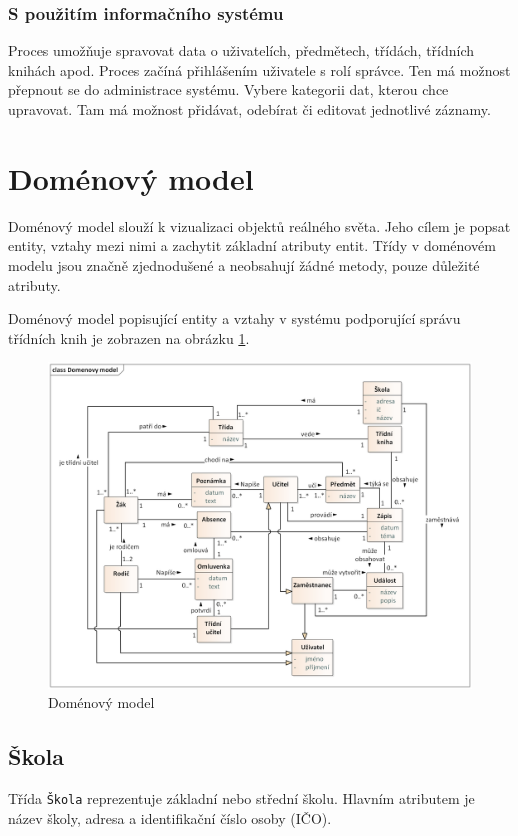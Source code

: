 \subsubsection*{S použitím informačního systému}
Proces umožňuje spravovat data o uživatelích, předmětech, třídách, třídních knihách apod. Proces začíná přihlášením uživatele s rolí správce. Ten má možnost přepnout se do administrace systému. Vybere kategorii dat, kterou chce upravovat. Tam má možnost přidávat, odebírat či editovat jednotlivé záznamy.


\section{Doménový model}
Doménový model slouží k vizualizaci objektů reálného světa. Jeho cílem je popsat entity, vztahy mezi nimi a zachytit základní atributy entit. Třídy v doménovém modelu jsou značně zjednodušené a neobsahují žádné metody, pouze důležité atributy.

Doménový model popisující entity a vztahy v systému podporující správu třídních knih je zobrazen na obrázku \ref{domenovy_model}.

\begin{figure}[h]
	\centering
	\includegraphics[width=\textwidth]{images/Domenovy_model.png}
	\caption{Doménový model}
	\label{domenovy_model}
\end{figure}

\subsection{Škola}
Třída \texttt{Škola} reprezentuje základní nebo střední školu. Hlavním atributem je název školy, adresa a identifikační číslo osoby (IČO).
